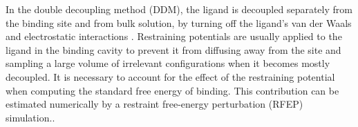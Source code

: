  In the double decoupling method (DDM), the ligand is decoupled separately from the binding site and from bulk solution, by turning off the ligand's van der Waals and electrostatic interactions \cite{Straatsma1992, Boresch2003, Nishikawa2018}.
 Restraining potentials are usually applied to the ligand in the binding cavity to prevent it from diffusing away from the site and sampling a large volume of irrelevant configurations when it becomes mostly decoupled\cite{Deng2009}.
 It is necessary to account for the effect of the restraining potential when computing the standard free energy of binding.
 This contribution can be estimated numerically by a restraint free-energy perturbation (RFEP) simulation.\cite{Mobley2006, Deng2009, Salari2018, Sakae2020}.
